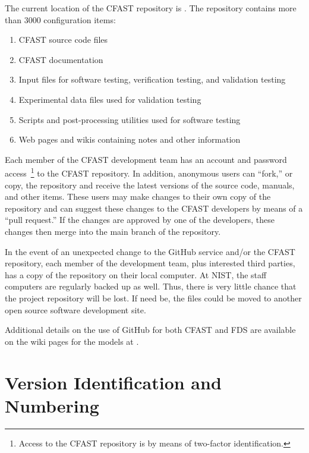 \documentclass[12pt]{book}
\begin{document}
The current location of the CFAST repository is \href{https://github.com/firemodels/cfast}{}. The repository contains more than 3000 configuration items:
\begin{enumerate}
\item CFAST source code files
\item CFAST documentation
\item Input files for software testing, verification testing, and validation testing
\item Experimental data files used for validation testing
\item Scripts and post-processing utilities used for software testing
\item Web pages and wikis containing notes and other information
\end{enumerate}

Each member of the CFAST development team has an account and password access~\footnote{Access to the CFAST repository is by means of two-factor identification.} to the CFAST repository. In addition, anonymous users can ``fork,'' or copy, the repository and receive the latest versions of the source code, manuals, and other items. These users may make changes to their own copy of the repository and can suggest these changes to the CFAST developers by means of a ``pull request.'' If the changes are approved by one of the developers, these changes then merge into the main branch of the repository.

In the event of an unexpected change to the GitHub service and/or the CFAST repository, each member of the development team, plus interested third parties, has a copy of the repository on their local computer. At NIST, the staff computers are regularly backed up as well. Thus, there is very little chance that the project repository will be lost. If need be, the files could be moved to another open source software development site.

Additional details on the use of GitHub for both CFAST and FDS are available on the wiki pages for the models at \href{https://github.com/firemodels/fds-smv/wiki}{}.

\section{Version Identification and Numbering}
\end{document}
